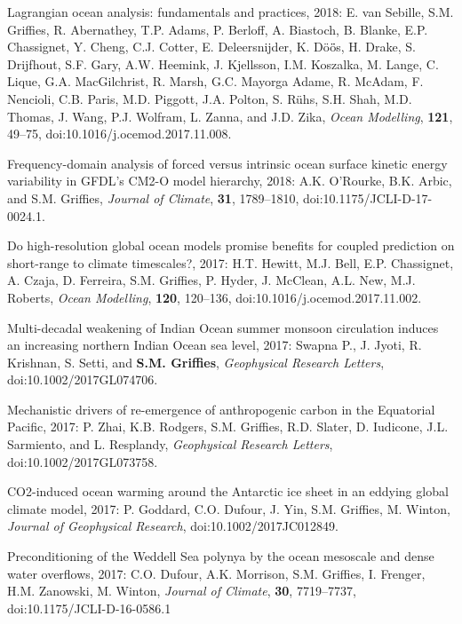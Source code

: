 \begin{etaremune}
\item  Lagrangian ocean analysis: fundamentals and practices, 2018: E. van Sebille, S.M. Grif\/f\/ies, R. Abernathey, T.P. Adams, P. Berloff, A. Biastoch, B. Blanke, E.P. Chassignet, Y. Cheng, C.J. Cotter, E. Deleersnijder, K. {D\"{o}\"{o}̈s}, H. Drake, S. Drijfhout, S.F. Gary, A.W. Heemink, J. Kjellsson, I.M. Koszalka, M. Lange, C. Lique, G.A.  MacGilchrist, R. Marsh, G.C. Mayorga Adame, R. McAdam, F. Nencioli, C.B. Paris, M.D. Piggott, J.A. Polton, S. {R\"{u}hs}, S.H. Shah, M.D. Thomas, J. Wang, P.J. Wolfram, L. Zanna, and J.D. Zika, {\it Ocean Modelling},
{\bf 121}, 49--75,  doi:10.1016/j.ocemod.2017.11.008.

\item Frequency-domain analysis of forced versus intrinsic ocean surface kinetic energy variability in GFDL's CM2-O model hierarchy, 2018: A.K. O'Rourke, B.K. Arbic, and S.M. Grif\/f\/ies, {\it Journal of Climate}, {\bf 31}, 1789--1810, doi:10.1175/JCLI-D-17-0024.1.

\item Do high-resolution global ocean models promise benefits for coupled prediction on short-range to climate timescales?, 2017: H.T. Hewitt, M.J. Bell, E.P. Chassignet, A. Czaja, D. Ferreira, S.M. Grif\/f\/ies, P. Hyder, J. McClean, A.L. New, M.J. Roberts, {\it Ocean Modelling}, {\bf 120}, 120--136, doi:10.1016/j.ocemod.2017.11.002.

\item Multi-decadal weakening of Indian Ocean summer monsoon circulation induces an increasing northern Indian Ocean sea level, 2017: Swapna P., J. Jyoti, R. Krishnan, S. Setti, and {\bf  S.M. Grif\/f\/ies}, {\it Geophysical Research  Letters}, \newline doi:10.1002/2017GL074706.



\item Mechanistic drivers of re-emergence of anthropogenic carbon in the Equatorial Pacific, 2017: P. Zhai, K.B. Rodgers, S.M. Grif\/fies, R.D. Slater, D. Iudicone, J.L. Sarmiento, and L. Resplandy, {\it Geophysical Research Letters}, doi:10.1002/2017GL073758.

\item CO2-induced ocean warming around the Antarctic ice sheet in an eddying global climate model, 2017: P. Goddard, C.O. Dufour, J. Yin, S.M. Grif\/f\/ies, M. Winton, {\it Journal of Geophysical Research}, doi:10.1002/2017JC012849. 

\item Preconditioning of the Weddell Sea polynya by the ocean mesoscale and dense water overflows, 2017: C.O. Dufour, A.K. Morrison, S.M. Grif\/f\/ies, I. Frenger, H.M. Zanowski, M. Winton, {\it Journal of Climate}, {\bf 30}, 7719--7737, doi:10.1175/JCLI-D-16-0586.1


\end{etaremune}
